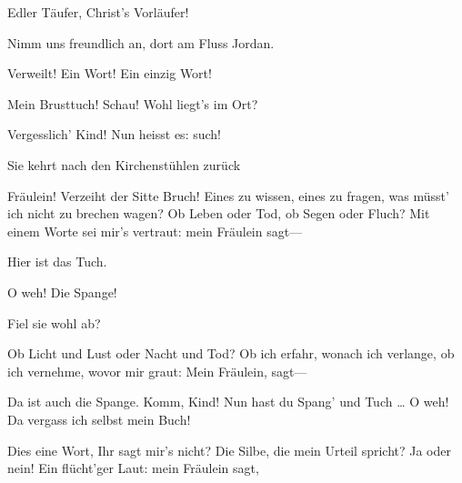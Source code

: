 \begin{drama}
Edler Täufer, Christ's Vorläufer! 


Nimm uns freundlich an, dort am Fluss Jordan.

  

\Waltherspeaks
{}

Verweilt! Ein Wort! Ein einzig Wort!

\Evaspeaks
{}

Mein Brusttuch! Schau! Wohl liegt's im Ort?

\Magdalenespeaks

Vergesslich' Kind! Nun heisst es: such!

Sie kehrt nach den Kirchenstühlen zurück

\Waltherspeaks

Fräulein! Verzeiht der Sitte Bruch!
Eines zu wissen, eines zu fragen,
was müsst' ich nicht zu brechen wagen?
Ob Leben oder Tod, ob Segen oder Fluch?
Mit einem Worte sei mir's vertraut:
mein Fräulein sagt---

\Magdalenespeaks


Hier ist das Tuch.

\Evaspeaks
O weh! Die Spange!

\Magdalenespeaks

Fiel sie wohl ab?


\Waltherspeaks
Ob Licht und Lust oder Nacht und Tod?
Ob ich erfahr, wonach ich verlange,
ob ich vernehme, wovor mir graut:
Mein Fräulein, sagt---

\Magdalenespeaks
{}

Da ist auch die Spange.
Komm, Kind! Nun hast du Spang' und Tuch \ldots
O weh! Da vergass ich selbst mein Buch!


\Waltherspeaks
Dies eine Wort, Ihr sagt mir's nicht?
Die Silbe, die mein Urteil spricht?
Ja oder nein! Ein flücht'ger Laut:
mein Fräulein sagt,


\end{drama}
